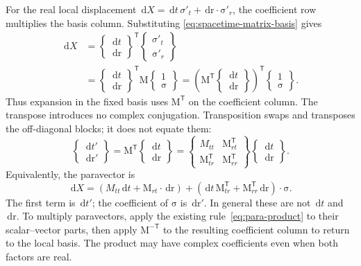 \documentclass[11pt]{article}
\newcommand{\pv}[1]{{#1}}
\newcommand{\pvGreek}[1]{{#1}}
\newcommand{\vstyle}[1]{{\bm{\mathrm{#1}}}}
\newcommand{\pSigmaTPrime}{\pvsigma'_t}
\newcommand{\bsigRPrime}{\bsig'_r}
\newcommand{\pX}{\pv{X}}
\newcommand{\pvsigma}{\pvGreek{\sigma}}
\numberwithin{equation}{section}
\newcommand{\dotprod}{\cdot}
\newcommand{\bsig}{\vstyle{\sigma}}
\newcommand{\br}{\vstyle{r}}
\newcommand{\bM}{\vstyle{M}}
\newcommand{\dd}{\,\mathrm d}
\begin{document}
For the real local displacement
$\dd\pX=\dd t\,\pSigmaTPrime+\dd\br\dotprod\bsigRPrime$,
the coefficient row multiplies the basis column.
Substituting \eqref{eq:spacetime-matrix-basis} gives
\[
 \begin{aligned}
 \dd\pX
 &=\begin{Bmatrix}\dd t\\\dd\br\end{Bmatrix}^{\mathsf T}
   \begin{Bmatrix}\pSigmaTPrime\\\bsigRPrime\end{Bmatrix}\\
 &=\begin{Bmatrix}\dd t\\\dd\br\end{Bmatrix}^{\mathsf T}
   \bM\begin{Bmatrix}1\\\bsig\end{Bmatrix}
 =\left(\bM^{\mathsf T}\begin{Bmatrix}\dd t\\\dd\br\end{Bmatrix}\right)^{\mathsf T}
   \begin{Bmatrix}1\\\bsig\end{Bmatrix}.
 \end{aligned}
\]
Thus expansion in the fixed basis uses $\bM^{\mathsf T}$ on the
coefficient column. The transpose introduces no complex conjugation.
Transposition swaps and transposes the off-diagonal blocks; it does not equate them:
\begin{equation}
 \begin{Bmatrix}\dd t'\\\dd\br'\end{Bmatrix}
 =\bM^{\mathsf T}\begin{Bmatrix}\dd t\\\dd\br\end{Bmatrix}
 =\begin{Bmatrix}M_{tt}&\bM_{rt}^{\mathsf T}\\
                  \bM_{tr}^{\mathsf T}&\bM_{rr}^{\mathsf T}\end{Bmatrix}
   \begin{Bmatrix}\dd t\\\dd\br\end{Bmatrix}
 .
 \label{eq:spacetime-basis-coefficients}
\end{equation}
Equivalently, the paravector is
\[
 \dd\pX=(M_{tt}\dd t+\bM_{rt}\dotprod\dd\br)
      +(\dd t\,\bM_{tr}^{\mathsf T}
                    +\bM_{rr}^{\mathsf T}\dd\br)\dotprod\bsig.
\]
The first term is $\dd t'$; the coefficient of $\bsig$ is $\dd\br'$.
In general these are not $\dd t$ and $\dd\br$.
To multiply paravectors, apply the existing rule~\eqref{eq:para-product}
to their scalar--vector parts, then apply $\bM^{-\mathsf T}$ to the
resulting coefficient column to return to the local basis.
The product may have complex coefficients even when both factors are real.
\end{document}
